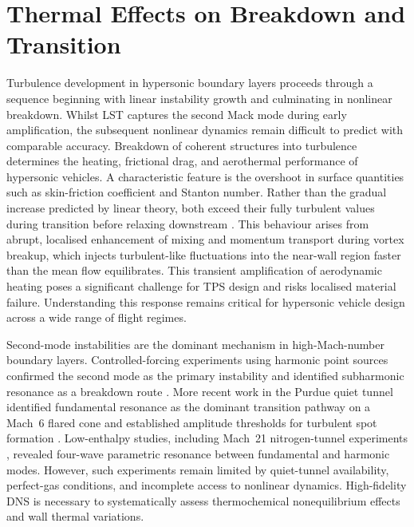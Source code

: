   \chapter{Thermal Effects on Breakdown and Transition}\label{chapter:breakdown}

Turbulence development in hypersonic boundary layers proceeds through a sequence beginning with linear instability growth and culminating in nonlinear breakdown. Whilst \gls{LST} captures the second Mack mode during early amplification, the subsequent nonlinear dynamics remain difficult to predict with comparable accuracy. Breakdown of coherent structures into turbulence determines the heating, frictional drag, and aerothermal performance of hypersonic vehicles. A characteristic feature is the overshoot in surface quantities such as skin-friction coefficient and Stanton number. Rather than the gradual increase predicted by linear theory, both exceed their fully turbulent values during transition before relaxing downstream \citep{Holden1972}. This behaviour arises from abrupt, localised enhancement of mixing and momentum transport during vortex breakup, which injects turbulent-like fluctuations into the near-wall region faster than the mean flow equilibrates. This transient amplification of aerodynamic heating poses a significant challenge for \gls{TPS} design and risks localised material failure. Understanding this response remains critical for hypersonic vehicle design across a wide range of flight regimes.

Second-mode instabilities are the dominant mechanism in high-Mach-number boundary layers. Controlled-forcing experiments using harmonic point sources confirmed the second mode as the primary instability and identified subharmonic resonance as a breakdown route \citep{Shiplyuk2003,Bountin2008}. More recent work in the Purdue quiet tunnel identified fundamental resonance as the dominant transition pathway on a Mach~6 flared cone \citep{Chynoweth2014} and established amplitude thresholds for turbulent spot formation \citep{Casper2011,Casper2012}. Low-enthalpy studies, including Mach~21 nitrogen-tunnel experiments \citep{Mironov2000}, revealed four-wave parametric resonance between fundamental and harmonic modes. However, such experiments remain limited by quiet-tunnel availability, perfect-gas conditions, and incomplete access to nonlinear dynamics. High-fidelity \gls{DNS} is necessary to systematically assess thermochemical nonequilibrium effects and wall thermal variations.

